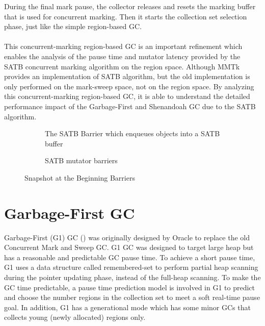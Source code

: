 During the final mark pause, the collector releases and resets the marking buffer that
is used for concurrent marking. Then it starts the collection set selection phase, just like the
simple region-based GC.
\\\\

This concurrent-marking region-based GC is an important refinement which enables
the analysis of the pause time and mutator latency provided by the SATB concurrent marking algorithm on the region space.
Although MMTk provides an implementation of SATB algorithm, but the old implementation
is only performed on the mark-sweep space, not on the region space.
By analyzing this concurrent-marking region-based GC, it is able to understand the
detailed performance impact of the Garbage-First and Shenandoah GC due to the SATB algorithm.

\begin{figure}
  \centering
  \begin{subfigure}[a]{\textwidth}
    
    \caption{The SATB Barrier which enqueues objects into a SATB buffer}
    \label{fig:c:hello}
  \end{subfigure}

  \begin{subfigure}[b]{\textwidth}
    
    \caption{SATB mutator barriers}
    \label{fig:c:hello}
  \end{subfigure}

  \caption{Snapshot at the Beginning Barriers}
  \label{fig:satbbarrier}
\end{figure}

\section{Garbage-First GC}
\label{sec:g1gc}

Garbage-First (G1) GC (\cite{detlefs2004garbage}) was originally designed by Oracle to replace
the old Concurrent Mark and Sweep GC. G1 GC was designed to target large heap but
has a reasonable and predictable GC pause time. To achieve a short pause time, G1
uses a data structure called remembered-set to perform partial heap scanning during the
pointer updating phase, instead of the full-heap scanning. To make the GC time predictable,
a pause time prediction model is involved in G1 to predict and choose the number regions in the
collection set to meet a soft real-time pause goal. In addition, G1 has a generational
mode which has some minor GCs that collects young (newly allocated) regions only.

